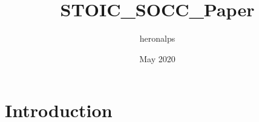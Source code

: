 \documentclass{article}
\title{STOIC_SOCC_Paper}
\author{heronalps }
\date{May 2020}
\begin{document}
\maketitle

\section{Introduction}
\end{document}
